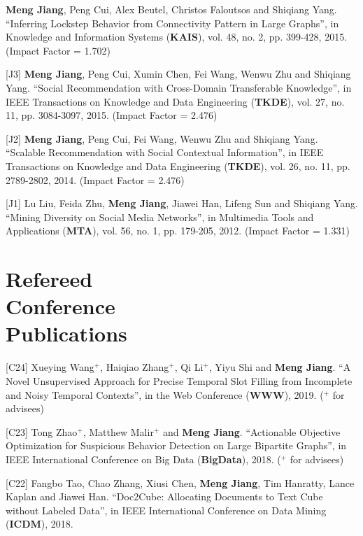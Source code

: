 \documentclass[margin, 9pt]{res}
\begin{document}
\begin{resume}
[J4] \textbf{Meng Jiang}, Peng Cui, Alex Beutel, Christos Faloutsos and Shiqiang Yang. ``Inferring Lockstep Behavior from Connectivity Pattern in Large Graphs'', in Knowledge and Information Systems (\textbf{KAIS}), vol. 48, no. 2, pp. 399-428, 2015. (Impact Factor = 1.702)

[J3] \textbf{Meng Jiang}, Peng Cui, Xumin Chen, Fei Wang, Wenwu Zhu and Shiqiang Yang. ``Social Recommendation with Cross-Domain Transferable Knowledge'', in IEEE Transactions on Knowledge and Data Engineering (\textbf{TKDE}), vol. 27, no. 11, pp. 3084-3097, 2015. (Impact Factor = 2.476)

[J2] \textbf{Meng Jiang}, Peng Cui, Fei Wang, Wenwu Zhu and Shiqiang Yang. ``Scalable Recommendation with Social Contextual Information'', in IEEE Transactions on Knowledge and Data Engineering (\textbf{TKDE}), vol. 26, no. 11, pp. 2789-2802, 2014. (Impact Factor = 2.476)

[J1] Lu Liu, Feida Zhu, \textbf{Meng Jiang}, Jiawei Han, Lifeng Sun and Shiqiang Yang. ``Mining Diversity on Social Media Networks'', in Multimedia Tools and Applications (\textbf{MTA}), vol. 56, no. 1, pp. 179-205, 2012. (Impact Factor = 1.331)


\section{Refereed \\ Conference \\ Publications}

[C24] Xueying Wang${}^{+}$, Haiqiao Zhang${}^{+}$, Qi Li${}^{+}$, Yiyu Shi and \textbf{Meng Jiang}. ``A Novel Unsupervised Approach for Precise Temporal Slot Filling from Incomplete and Noisy Temporal Contexts'', in the Web Conference (\textbf{WWW}), 2019. (${}^{+}$ for advisees)

[C23] Tong Zhao${}^{+}$, Matthew Malir${}^{+}$ and \textbf{Meng Jiang}. ``Actionable Objective Optimization for Suspicious Behavior Detection on Large Bipartite Graphs'', in IEEE International Conference on Big Data (\textbf{BigData}), 2018. (${}^{+}$ for advisees)

[C22] Fangbo Tao, Chao Zhang, Xiusi Chen, \textbf{Meng Jiang}, Tim Hanratty, Lance Kaplan and Jiawei Han. ``Doc2Cube: Allocating Documents to Text Cube without Labeled Data'', in IEEE International Conference on Data Mining (\textbf{ICDM}), 2018.


\end{resume}
\end{document}
